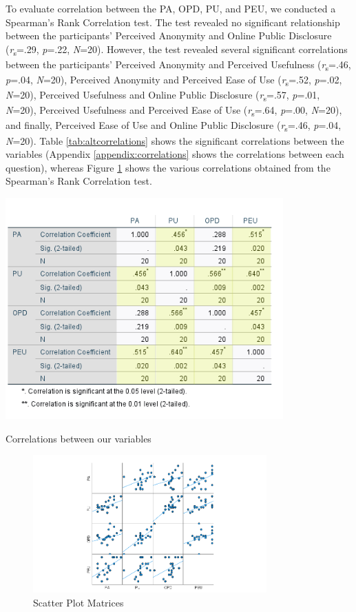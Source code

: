 To evaluate correlation between the PA, OPD, PU, and PEU, we conducted a Spearman's Rank Correlation test. The test revealed no significant relationship between the participants' Perceived Anonymity and Online Public Disclosure (\textit{r}\textsubscript{s}=.29, \textit{p}=.22, \textit{N}=20). However, the test revealed several significant correlations between the participants' Perceived Anonymity and Perceived Usefulness (\textit{r}\textsubscript{s}=.46, \textit{p}=.04, \textit{N}=20), Perceived Anonymity and Perceived Ease of Use (\textit{r}\textsubscript{s}=.52, \textit{p}=.02, \textit{N}=20), Perceived Usefulness and Online Public Disclosure (\textit{r}\textsubscript{s}=.57, \textit{p}=.01, \textit{N}=20), Perceived Usefulness and Perceived Ease of Use (\textit{r}\textsubscript{s}=.64, \textit{p}=.00, \textit{N}=20), and finally, Perceived Ease of Use and Online Public Disclosure (\textit{r}\textsubscript{s}=.46, \textit{p}=.04, \textit{N}=20). Table \ref{tab:altcorrelations} shows the significant correlations between the variables (Appendix \ref{appendix:correlations} shows the correlations between each question), whereas Figure \ref{fig:scatterbox} shows the various correlations obtained from the Spearman's Rank Correlation test.

\begin{table}[!htb]
\includegraphics[width=0.8\textwidth]{figures/altCorrelations.png}
\centering
\caption{Correlations between our variables}
\label{tab:altcorrelations}
\end{table}

\begin{figure}[!htb]
\includegraphics[width=0.8\textwidth]{figures/scatterbox.png}
\centering
\caption{Scatter Plot Matrices}
\label{fig:scatterbox}
\end{figure}

